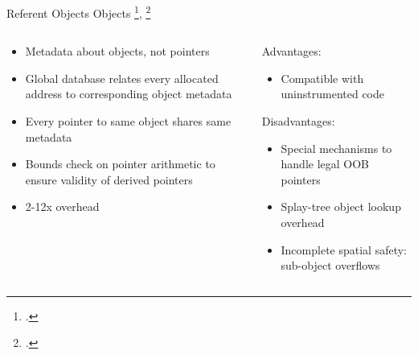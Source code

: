 \documentclass[aspectratio=169]{beamer}
\begin{document}
\begin{frame}[fragile]{Referent Objects}
Objects \footcite{jones_backwards-compatible_1997}, \footcite{ruwase_practical_2004}
\footnotesize
\begin{columns}[T]
\begin{column}{0.45\textwidth}
\begin{itemize}[<+->]
    \item Metadata about \alert{objects}, not pointers
    \item Global database relates every allocated address to corresponding object metadata 
    \item Every pointer to same object shares same metadata
    \item Bounds check on \alert{pointer arithmetic}  to ensure validity of derived pointers 
    \item 2-12x overhead
\end{itemize}
\end{column}

\pause

\begin{column}{0.45\textwidth}
Advantages:
\begin{itemize}
  \item Compatible with uninstrumented code 
\end{itemize}
\pause
Disadvantages:
\begin{itemize}
  \item Special mechanisms to handle legal OOB pointers 
  \item Splay-tree object lookup overhead
  \item Incomplete spatial safety: \alert{sub-object overflows} 
\end{itemize}
\end{column}
\end{columns}

\vspace{0.1in}

\end{frame}
\end{document}
